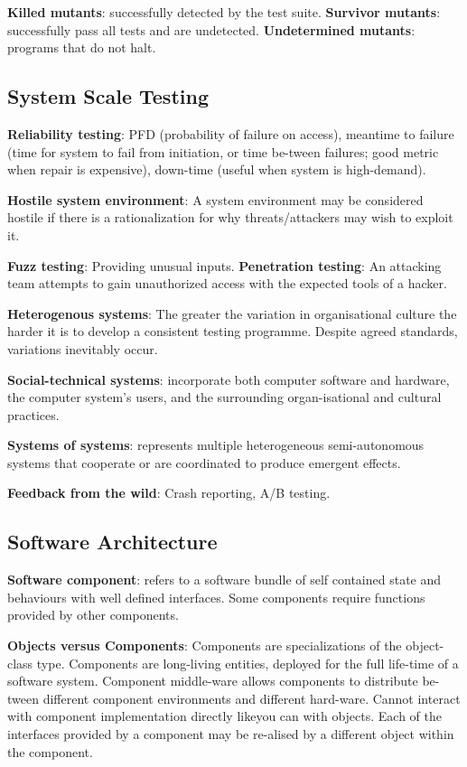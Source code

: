 \documentclass{article}
\begin{document}
\noindent \textbf{Killed mutants}: successfully detected by the test suite.
\noindent \textbf{Survivor mutants}: successfully pass all tests and are undetected.
\noindent \textbf{Undetermined mutants}: programs that do not halt.


\subsection*{System Scale Testing}

\noindent \textbf{Reliability testing}: PFD (probability of failure on access), meantime to failure (time for system to fail from initiation,
or time be-tween failures; good metric when repair is expensive), down-time (useful when system is high-demand).

\noindent \textbf{Hostile system environment}: A system environment may be considered hostile if there is a rationalization for why threats/attackers may wish to exploit it.

\noindent \textbf{Fuzz testing}: Providing unusual inputs.
\noindent \textbf{Penetration testing}: An attacking team attempts to gain unauthorized access with the expected tools of a hacker.

\noindent \textbf{Heterogenous systems}: The greater the variation in organisational culture the harder it is to develop a consistent testing programme. Despite agreed standards, variations inevitably occur.

\noindent \textbf{Social-technical systems}: incorporate both computer software and hardware, the computer system’s users, and the surrounding organ-isational and cultural practices.

\noindent \textbf{Systems of systems}: represents multiple heterogeneous semi-autonomous systems that cooperate or are coordinated to produce emergent effects.

\noindent \textbf{Feedback from the wild}: Crash reporting, A/B testing.


\subsection*{Software Architecture}

\noindent \textbf{Software component}: refers to a software bundle of self contained state and behaviours with well defined interfaces. Some components require functions provided by other components.

\noindent \textbf{Objects versus Components}:
Components are specializations of the object-class type.
Components are long-living entities, deployed for the full life-time of a software system.
Component middle-ware allows components to distribute be-tween different component environments and different hard-ware.
Cannot interact with component implementation directly likeyou can with objects.
Each of the interfaces provided by a component may be re-alised by a different object within the component.
\end{document}
